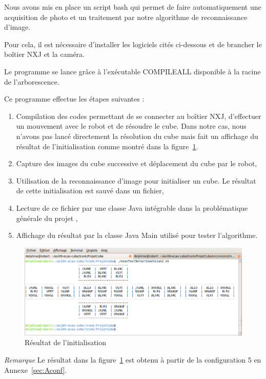   Nous avons mis en place un script bash qui permet de faire automatiquement une acquisition de photo et un traitement par notre algorithme de reconnaissance d'image. 

  Pour cela, il est nécessaire d'installer les logiciels cités ci-dessous et de brancher le boîtier NXJ et la caméra. 

  Le programme se lance grâce à l'exécutable COMPILEALL disponible à la racine de l'arborescence. 

  Ce programme effectue les étapes suivantes : 
  \begin{enumerate}
    \item Compilation des codes permettant de se connecter au boîtier NXJ, d'effectuer un mouvement avec le robot et de résoudre le cube. Dans notre cas, nous n'avons pas lancé directement la résolution du cube mais fait un affichage du résultat de l'initialisation comme montré dans la figure~\ref{fig:aff}.

    \item Capture des images du cube successive et déplacement du cube par le robot, 
    \item Utilisation de la reconnaissance d'image pour initialiser un cube. 
Le résultat de cette initialisation est sauvé dans un fichier, 
    \item Lecture de ce fichier par une classe Java intégrable dans la problématique générale du projet \rubic, 
    \item Affichage du résultat par la classe Java Main utilisé pour tester l'algorithme. 
  \end{enumerate}
    
  \begin{figure}[h!]
    \centering
    \includegraphics[width=0.8\linewidth]{./Images/affichage.png}
    \caption{Résultat de l'initialisation}
    \label{fig:aff}
   \end{figure}
  
  \textit{Remarque} Le résultat dans la figure~\ref{fig:aff} est obtenu à partir de la configuration 5 en Annexe~\ref{sec:Aconf}. 


